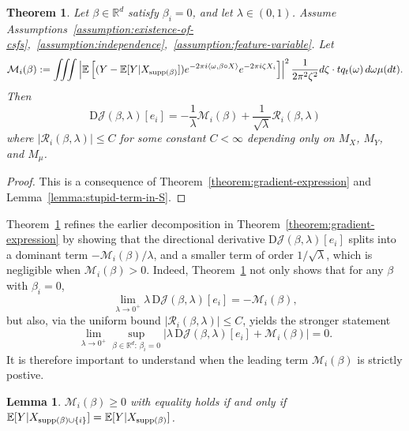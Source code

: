 \documentclass[sn-mathphys-num]{sn-jnl}%
\numberwithin{equation}{section}
\newcommand{\R}{\mathbb{R}}
\newcommand{\E}{\mathbb{E}}
\newtheorem{lemma}{Lemma}
\newcommand{\supp}{\mathop{\rm supp}}
\theoremstyle{thmstyleone}%
\newtheorem{theorem}{Theorem}%
\theoremstyle{thmstyletwo}%
\theoremstyle{thmstylethree}%
\begin{document}
\begin{theorem} 
\label{theorem:gradient-expression-ANOVA}
Let $\beta \in \R^d$ satisfy $\beta_i = 0$, and let $\lambda \in (0, 1)$. Assume Assumptions~\ref{assumption:existence-of-csfs},~\ref{assumption:independence},~\ref{assumption:feature-variable}. Let 
\begin{equation*} 
	 \mathcal{M}_i(\beta): =  \iiint \left|\mathbb{E}\left[(Y-\E[Y|X_{\supp(\beta)}]) e^{-2\pi i \langle \omega, \beta \circ X \rangle}  e^{-2\pi i \zeta X_i}\right]\right|^2 \frac{1}{2\pi^2 \zeta^2} d\zeta \cdot t q_t(\omega) \, d\omega  \mu(dt).
\end{equation*}
Then
\begin{equation*}
	\mathrm{D}\mathcal{J}(\beta, \lambda)[e_i] = - \frac{1}{\lambda} \mathcal{M}_i(\beta) + \frac{1}{\sqrt{\lambda}}\mathcal{R}_i(\beta, \lambda)
\end{equation*}
where $|\mathcal{R}_i(\beta, \lambda)| \le C$ 
for some constant $C < \infty$ depending only on $M_X$, $M_Y$, and $M_\mu$.
\end{theorem} 

\begin{proof} %
This is a consequence of Theorem~\ref{theorem:gradient-expression} and Lemma~\ref{lemma:stupid-term-in-S}.
\end{proof} 

Theorem~\ref{theorem:gradient-expression-ANOVA} refines the earlier decomposition in Theorem~\ref{theorem:gradient-expression} by showing that 
the directional derivative $\mathrm{D}\mathcal{J}(\beta, \lambda)[e_i]$ splits into a dominant term 
$-\mathcal{M}_i(\beta)/\lambda$, and a smaller term of order $1/\sqrt{\lambda}$, which is negligible when 
$\mathcal{M}_i(\beta) > 0$. Indeed, Theorem~\ref{theorem:gradient-expression-ANOVA} not only shows that for any $\beta$ with $\beta_i = 0$,  
\[
\lim_{\lambda \to 0^+} \lambda \, \mathrm{D}\mathcal{J}(\beta, \lambda)[e_i] = -\mathcal{M}_i(\beta),
\]
but also, via the uniform bound $|\mathcal{R}_i(\beta, \lambda)| \le C$, yields the stronger statement  
\[
\lim_{\lambda \to 0^+} 
\sup_{\beta \in \R^d: \, \beta_i = 0} 
\left| \lambda \, \mathrm{D}\mathcal{J}(\beta, \lambda)[e_i] + \mathcal{M}_i(\beta) \right| = 0.
\]
It is therefore important to understand when the leading term $\mathcal{M}_i(\beta)$ is strictly postive. 

\vspace{.8em} 
\begin{lemma}
\label{lemma:S-I-positive} 
$\mathcal{M}_i(\beta) \ge 0$ with equality holds if and only if $\E[Y|X_{\supp(\beta) \cup \{i\}}] = \E[Y|X_{\supp(\beta)}]$.
\end{lemma}
\end{document}
